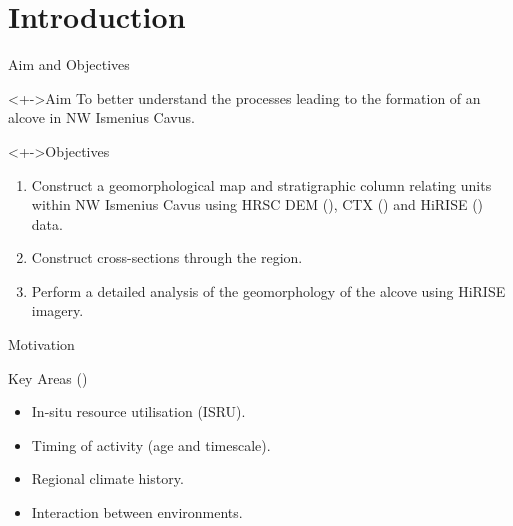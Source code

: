 \section{Introduction}
\begin{frame}{Aim and Objectives}
    \begin{alertblock}<+->{Aim}
        To better understand the processes leading to the formation of an alcove in NW Ismenius Cavus.
    \end{alertblock}
    \begin{block}<+->{Objectives}
        \begin{enumerate}
            \item Construct a geomorphological map and stratigraphic column relating units within NW Ismenius Cavus using HRSC DEM (\cite{HRSC}), CTX (\cite{CTX}) and HiRISE (\cite{HiRISE}) data.
            \item<+-> Construct cross-sections through the region.
            \item<+-> Perform a detailed analysis of the geomorphology of the alcove using HiRISE imagery.
        \end{enumerate}
    \end{block}
\end{frame}

\begin{frame}{Motivation}
\begin{block}{Key Areas (\cite{Diniega21})}
    \begin{itemize}
        \item<+-> In-situ resource utilisation (ISRU).
        \item<+-> Timing of activity (age and timescale).
        \item<+-> Regional climate history.
        \item<+-> Interaction between environments.
    \end{itemize}
\end{block}
\end{frame}